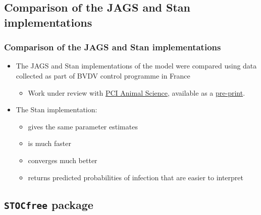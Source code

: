 \documentclass{beamer}
\begin{document}
\subsection[JAGS vs. Stan]{Comparison of the JAGS and Stan implementations}

\begin{frame}
\frametitle{Comparison of the JAGS and Stan implementations}
\begin{itemize}
 \item{The JAGS and Stan implementations of the model were compared using data collected as part of BVDV control programme in France}
 \begin{itemize}
  \item{Work under review with \href{https://animsci.peercommunityin.org/}{PCI Animal Science}, available as a \href{https://www.biorxiv.org/content/10.1101/2020.07.10.197426v4.full}{pre-print}.}
 \end{itemize}
 \item{The Stan implementation:}
 \begin{itemize}
  \item{gives the same parameter estimates}
  \item{is much faster}
  \item{converges much better}
  \item{returns predicted probabilities of infection that are easier to interpret}
 \end{itemize}
\end{itemize}
\end{frame}

\subsection{\texttt{STOCfree} package}
\end{document}

